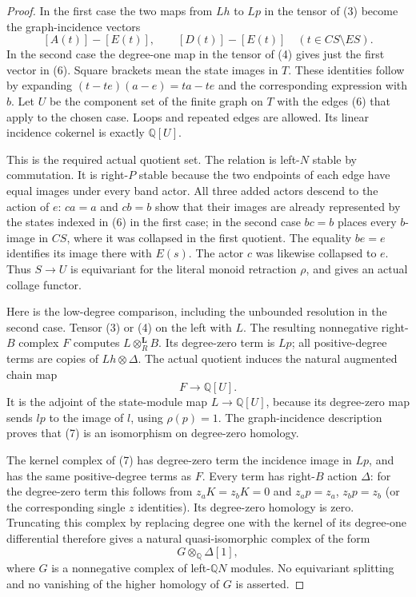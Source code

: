 \begin{proof}
In the first case the two maps from $Lh$ to $Lp$
in the tensor of (3) become the graph-incidence vectors
\[
 [A(t)]-[E(t)],\qquad [D(t)]-[E(t)]
       \quad(t\in CS\setminus ES).                            \tag{6}
\]
In the second case the degree-one map in the tensor
of (4) gives just the first vector in (6).
Square brackets mean the state images in $T$.
These identities follow by expanding
$(t-te)(a-e)=ta-te$ and the corresponding expression
with $b$.
Let $U$ be the component set of the finite graph on
$T$ with the edges (6) that apply to the chosen case.
Loops and repeated edges are allowed.
Its linear incidence cokernel is exactly $\mathbb Q[U]$.

This is the required actual quotient set.
The relation is left-$N$ stable by commutation.
It is right-$P$ stable because the two endpoints of
each edge have equal images under every band actor.
All three added actors descend to the action of $e$:
$ca=a$ and $cb=b$ show that their images are already
represented by the states indexed in (6) in the first
case; in the second case $bc=b$ places every $b$-image
in $CS$, where it was collapsed in the first quotient.
The equality $be=e$ identifies its image there with
$E(s)$.  The actor $c$ was likewise collapsed to $e$.
Thus $S\to U$ is equivariant for the literal monoid
retraction $\rho$, and gives an actual collage functor.

Here is the low-degree comparison, including the
unbounded resolution in the second case.
Tensor (3) or (4) on the left with $L$.
The resulting nonnegative right-$B$ complex $F$
computes $L\otimes_R^{\mathbf L}B$.
Its degree-zero term is $Lp$; all positive-degree
terms are copies of $Lh\otimes\Delta$.
The actual quotient induces the natural augmented
chain map
\[
 F\longrightarrow\mathbb Q[U].                                \tag{7}
\]
It is the adjoint of the state-module map
$L\to\mathbb Q[U]$, because its degree-zero map
sends $lp$ to the image of $l$, using $\rho(p)=1$.
The graph-incidence description proves that (7)
is an isomorphism on degree-zero homology.

The kernel complex of (7) has degree-zero term
the incidence image in $Lp$, and has the same
positive-degree terms as $F$.
Every term has right-$B$ action $\Delta$: for the
degree-zero term this follows from $z_aK=z_bK=0$
and $z_ap=z_a$, $z_bp=z_b$ (or the corresponding
single $z$ identities).
Its degree-zero homology is zero.
Truncating this complex by replacing degree one
with the kernel of its degree-one differential
therefore gives a natural quasi-isomorphic complex
of the form
\[
 G\otimes_{\mathbb Q}\Delta[1],                                \tag{8}
\]
where $G$ is a nonnegative complex of left-$\mathbb QN$
modules.  No equivariant splitting and no vanishing
of the higher homology of $G$ is asserted.


\end{proof}
